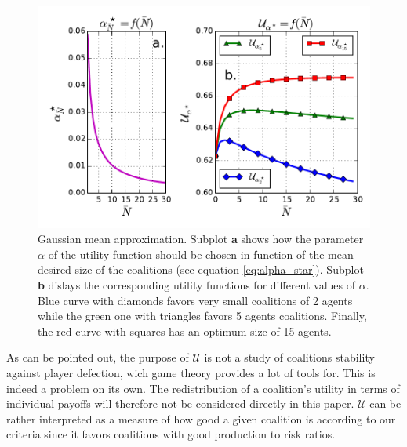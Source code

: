 \documentclass[conference]{IEEEtran}
\begin{document}
\begin{figure}
\includegraphics[scale=.6]{mean_field.pdf}
\caption{Gaussian mean approximation. Subplot \textbf{a} shows how the parameter $ \alpha $ of the utility function should be chosen in function of the mean desired size of the coalitions (see equation \ref{eq:alpha_star}). Subplot \textbf{b} dislays the corresponding utility functions for different values of $ \alpha $. Blue curve with diamonds favors very small coalitions of 2 agents while the green one with triangles favors 5 agents coalitions. Finally, the red curve with squares has an optimum size of 15 agents. }
\label{fig:mean_approx}
\end{figure}


As can be pointed out, the purpose of $ \mathcal{U} $ is not a study of coalitions stability against player defection, wich game theory provides a lot of tools for. This is indeed a problem on its own. The redistribution of a coalition's utility in terms of individual payoffs will therefore not be considered directly in this paper. $ \mathcal{U} $ can be rather interpreted as a measure of how good a given coalition is according to our criteria since it favors coalitions with good production to risk ratios.
\end{document}
